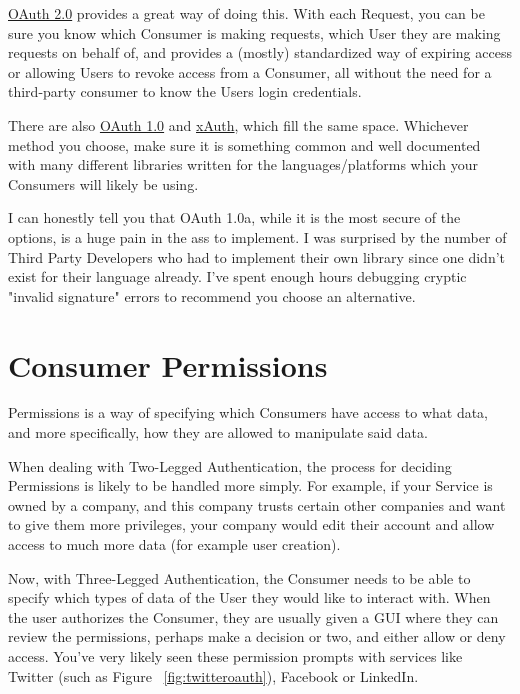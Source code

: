 \documentclass{book}
\begin{document}
\href{https://tools.ietf.org/html/rfc6749}{OAuth 2.0} provides a great way of doing this. With each Request, you can be sure you know which Consumer is making requests, which User they are making requests on behalf of, and provides a (mostly) standardized way of expiring access or allowing Users to revoke access from a Consumer, all without the need for a third-party consumer to know the Users login credentials.

There are also \href{http://tools.ietf.org/html/rfc5849}{OAuth 1.0} and \href{https://dev.twitter.com/docs/oauth/xauth}{xAuth}, which fill the same space. Whichever method you choose, make sure it is something common and well documented with many different libraries written for the languages/platforms which your Consumers will likely be using.

I can honestly tell you that OAuth 1.0a, while it is the most secure of the options, is a huge pain in the ass to implement. I was surprised by the number of Third Party Developers who had to implement their own library since one didn't exist for their language already. I've spent enough hours debugging cryptic "invalid signature" errors to recommend you choose an alternative.


\section{Consumer Permissions}

Permissions is a way of specifying which Consumers have access to what data, and more specifically, how they are allowed to manipulate said data.

When dealing with Two-Legged Authentication, the process for deciding Permissions is likely to be handled more simply. For example, if your Service is owned by a company, and this company trusts certain other companies and want to give them more privileges, your company would edit their account and allow access to much more data (for example user creation).

Now, with Three-Legged Authentication, the Consumer needs to be able to specify which types of data of the User they would like to interact with. When the user authorizes the Consumer, they are usually given a GUI where they can review the permissions, perhaps make a decision or two, and either allow or deny access. You've very likely seen these permission prompts with services like Twitter (such as Figure ~\ref{fig:twitteroauth}), Facebook or LinkedIn.
\end{document}
